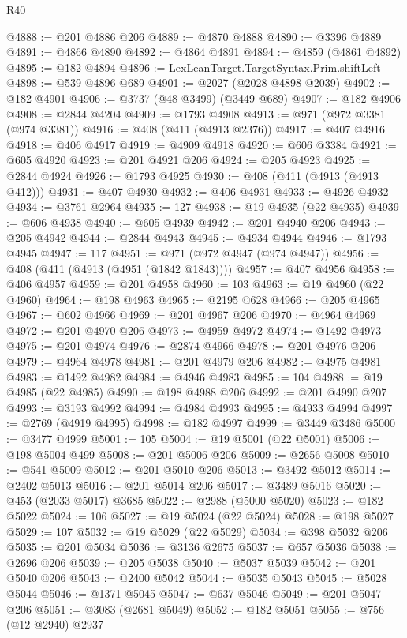 \begin{lexlean}{R40}
\begin{coremodule}
@4888 := @201 @4886 @206
@4889 := @4870 @4888
@4890 := @3396 @4889
@4891 := @4866 @4890
@4892 := @4864 @4891
@4894 := @4859 (@4861 @4892)
@4895 := @182 @4894
@4896 := LexLeanTarget.TargetSyntax.Prim.shiftLeft
@4898 := @539 @4896 @689
@4901 := @2027 (@2028 @4898 @2039)
@4902 := @182 @4901
@4906 := @3737 (@48 @3499) (@3449 @689)
@4907 := @182 @4906
@4908 := @2844 @4204
@4909 := @1793 @4908
@4913 := @971 (@972 @3381 (@974 @3381))
@4916 := @408 (@411 (@4913 @2376))
@4917 := @407 @4916
@4918 := @406 @4917
@4919 := @4909 @4918
@4920 := @606 @3384
@4921 := @605 @4920
@4923 := @201 @4921 @206
@4924 := @205 @4923
@4925 := @2844 @4924
@4926 := @1793 @4925
@4930 := @408 (@411 (@4913 (@4913 @412)))
@4931 := @407 @4930
@4932 := @406 @4931
@4933 := @4926 @4932
@4934 := @3761 @2964
@4935 := 127
@4938 := @19 @4935 (@22 @4935)
@4939 := @606 @4938
@4940 := @605 @4939
@4942 := @201 @4940 @206
@4943 := @205 @4942
@4944 := @2844 @4943
@4945 := @4934 @4944
@4946 := @1793 @4945
@4947 := 117
@4951 := @971 (@972 @4947 (@974 @4947))
@4956 := @408 (@411 (@4913 (@4951 (@1842 @1843))))
@4957 := @407 @4956
@4958 := @406 @4957
@4959 := @201 @4958
@4960 := 103
@4963 := @19 @4960 (@22 @4960)
@4964 := @198 @4963
@4965 := @2195 @628
@4966 := @205 @4965
@4967 := @602 @4966
@4969 := @201 @4967 @206
@4970 := @4964 @4969
@4972 := @201 @4970 @206
@4973 := @4959 @4972
@4974 := @1492 @4973
@4975 := @201 @4974
@4976 := @2874 @4966
@4978 := @201 @4976 @206
@4979 := @4964 @4978
@4981 := @201 @4979 @206
@4982 := @4975 @4981
@4983 := @1492 @4982
@4984 := @4946 @4983
@4985 := 104
@4988 := @19 @4985 (@22 @4985)
@4990 := @198 @4988 @206
@4992 := @201 @4990 @207
@4993 := @3193 @4992
@4994 := @4984 @4993
@4995 := @4933 @4994
@4997 := @2769 (@4919 @4995)
@4998 := @182 @4997
@4999 := @3449 @3486
@5000 := @3477 @4999
@5001 := 105
@5004 := @19 @5001 (@22 @5001)
@5006 := @198 @5004 @499
@5008 := @201 @5006 @206
@5009 := @2656 @5008
@5010 := @541 @5009
@5012 := @201 @5010 @206
@5013 := @3492 @5012
@5014 := @2402 @5013
@5016 := @201 @5014 @206
@5017 := @3489 @5016
@5020 := @453 (@2033 @5017) @3685
@5022 := @2988 (@5000 @5020)
@5023 := @182 @5022
@5024 := 106
@5027 := @19 @5024 (@22 @5024)
@5028 := @198 @5027
@5029 := 107
@5032 := @19 @5029 (@22 @5029)
@5034 := @398 @5032 @206
@5035 := @201 @5034
@5036 := @3136 @2675
@5037 := @657 @5036
@5038 := @2696 @206
@5039 := @205 @5038
@5040 := @5037 @5039
@5042 := @201 @5040 @206
@5043 := @2400 @5042
@5044 := @5035 @5043
@5045 := @5028 @5044
@5046 := @1371 @5045
@5047 := @637 @5046
@5049 := @201 @5047 @206
@5051 := @3083 (@2681 @5049)
@5052 := @182 @5051
@5055 := @756 (@12 @2940) @2937

\end{coremodule}
\end{lexlean}
